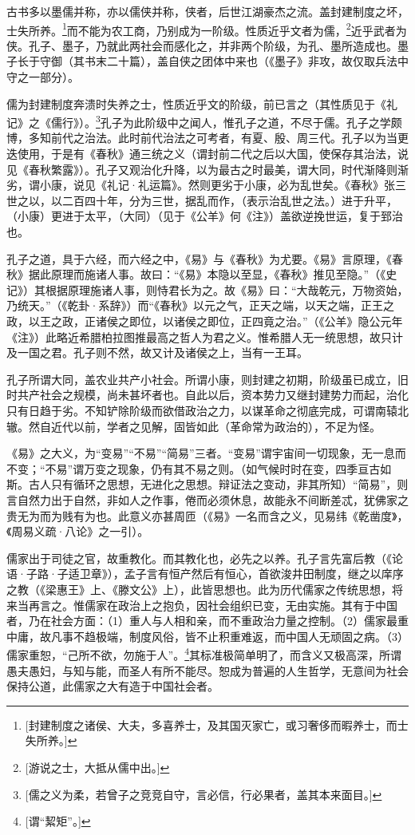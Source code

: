 古书多以墨儒并称，亦以儒侠并称，侠者，后世江湖豪杰之流。盖封建制度之坏，士失所养。\footnote{[封建制度之诸侯、大夫，多喜养士，及其国灭家亡，或习奢侈而暇养士，而士失所养。]}而不能为农工商，乃别成为一阶级。性质近乎文者为儒，\footnote{[游说之士，大抵从儒中出。]}近乎武者为侠。孔子、墨子，乃就此两社会而感化之，并非两个阶级，为孔、墨所造成也。墨子长于守御（其书末二十篇），盖自侠之团体中来也（《墨子》非攻，故仅取兵法中守之一部分）。

儒为封建制度奔溃时失养之士，性质近乎文的阶级，前已言之（其性质见于《礼记》之《儒行》）。\footnote{[儒之义为柔，若曾子之竞竞自守，言必信，行必果者，盖其本来面目。]}孔子为此阶级中之闻人，惟孔子之道，不尽于儒。孔子之学颇博，多知前代之治法。此时前代治法之可考者，有夏、殷、周三代。孔子以为当更迭使用，于是有《春秋》通三统之义（谓封前二代之后以大国，使保存其治法，说见《春秋繁露》）。孔子又观治化升降，以为最古之时最美，谓大同，时代渐降则渐劣，谓小康，说见《礼记·礼运篇》。然则更劣于小康，必为乱世矣。《春秋》张三世之以，以二百四十年，分为三世，据乱而作，（表示治乱世之法。）进于升平，（小康）更进于太平，（大同）（见于《公羊》何《注》）盖欲逆挽世运，复于郅治也。

孔子之道，具于六经，而六经之中，《易》与《春秋》为尤要。《易》言原理，《春秋》据此原理而施诸人事。故曰：“《易》本隐以至显，《春秋》推见至隐。”（《史记》）其根据原理施诸人事，则恃君长为之。故《易》曰：“大哉乾元，万物资始，乃统天。”（《乾卦·系辞》）而“《春秋》以元之气，正天之端，以天之端，正王之政，以王之政，正诸侯之即位，以诸侯之即位，正四竟之治。”（《公羊》隐公元年《注》）此略近希腊柏拉图推最高之哲人为君之义。惟希腊人无一统思想，故只计及一国之君。孔子则不然，故又计及诸侯之上，当有一王耳。

孔子所谓大同，盖农业共产小社会。所谓小康，则封建之初期，阶级虽已成立，旧时共产社会之规模，尚未甚坏者也。自此以后，资本势力又继封建势力而起，治化只有日趋于劣。不知铲除阶级而欲借政治之力，以谋革命之彻底完成，可谓南辕北辙。然自近代以前，学者之见解，固皆如此（革命常为政治的），不足为怪。

《易》之大义，为“变易”“不易”“简易”三者。“变易”谓宇宙间一切现象，无一息而不变；“不易”谓万变之现象，仍有其不易之则。（如气候时时在变，四季亘古如斯。古人只有循环之思想，无进化之思想。辩证法之变动，非其所知）“简易”，则言自然力出于自然，非如人之作事，倦而必须休息，故能永不间断差忒，犹佛家之贵无为而为贱有为也。此意义亦甚周匝（《易》一名而含之义，见易纬《乾凿度》，《周易义疏·八论》之一引）。

儒家出于司徒之官，故重教化。而其教化也，必先之以养。孔子言先富后教（《论语·子路·子适卫章》），孟子言有恒产然后有恒心，首欲浚井田制度，继之以庠序之教（《梁惠王》上、《滕文公》上），此皆思想也。此为历代儒家之传统思想，将来当再言之。惟儒家在政治上之抱负，因社会组织已变，无由实施。其有于中国者，乃在社会方面：（1）重人与人相和亲，而不重政治力量之控制。（2）儒家最重中庸，故凡事不趋极端，制度风俗，皆不止积重难返，而中国人无顽固之病。（3）儒家重恕，“己所不欲，勿施于人”。\footnote{[谓“絜矩”。]}其标准极简单明了，而含义又极高深，所谓愚夫愚妇，与知与能，而圣人有所不能尽。恕成为普遍的人生哲学，无意间为社会保持公道，此儒家之大有造于中国社会者。

